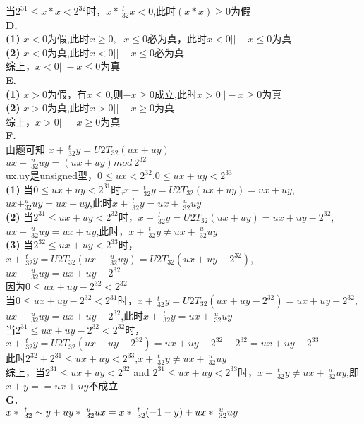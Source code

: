 \documentclass{article}
\begin{document}
\begin{CJK}{UTF8}{uyhei}
当$2^{ 31 }\le x*x<2^{ 32 }$时，$x*\ _{32}^tx<0$,此时$(x*x)\ge 0$为假	\\
\textbf{D.}	\\
\textbf{(1)} $x<0$为假,此时$x\ge 0$,$-x\le 0$必为真，此时$x<0 || -x\le 0$为真	\\
\textbf{(2)} $x<0$为真,此时$x<0 || -x\le 0$必为真	\\
综上，$x<0 || -x\le 0$为真	\\
\textbf{E.}	\\
\textbf{(1)} $x>0$为假，有$x\le 0$,则$-x\ge 0$成立,此时$x>0 ||-x\ge 0$为真	\\
\textbf{(2)} $x>0$为真,此时$x>0 ||-x\ge 0$为真	\\
综上，$x>0 ||-x\ge 0$为真	\\
\textbf{F.}	\\
由题可知
$x+\ _{32}^ty=U2T_{32}(ux+uy)$	\\
$ux+\ _{32}^uuy=( ux+uy ) mod\ 2^{32}$	\\
ux,uy是unsigned型，$0\le ux<2^{32}$,$0\le ux+uy<2^{33}$	\\
\textbf{(1)} 当$0\le ux+uy<2^{31}$时,$x+\ _{32}^ty=U2T_{32}(ux+uy)=ux+uy$,$ux+ _{32}^uuy=ux+uy$,此时$x+\ _{32}^ty=ux+\ _{32}^uuy$	\\
\textbf{(2)} 当$2^{31}\le ux+uy<2^{ 32 }$时，$x+\ _{32}^ty=U2T_{32}(ux+uy)=ux+uy-2^{32}$,$ux+\ _{32}^uuy=ux+uy$,此时，$x+\ _{32}^ty\ne ux+\ _{32}^uuy$	\\
\textbf{(3)} 当$2^{32}\le ux+uy<2^{33}$时，$x+\ _{32}^ty=U2T_{32}(ux+\ _{32}^uuy)=U2T_{32}(ux+uy-2^{32})$,$ux+\ _{32}^uuy=ux+uy-2^{32}$	\\
因为$0\le ux+uy-2^{32}<2^{32}$	\\
当$0\le ux+uy-2^{32}<2^{31}$时，$x+\ _{32}^ty=U2T_{32}(ux+uy-2^{32})=ux+uy-2^{32}$,$ux+\ _{32}^uuy=ux+uy-2^{32}$,此时$x+\ _{32}^ty=ux+\ _{32}^uuy$	\\
当$2^{31}\le ux+uy-2^{32}<2^{32}$时，$x+\ _{32}^ty=U2T_{32}(ux+uy-2^{32})=ux+uy-2^{32}-2^{32}=ux+uy-2^{33}$	\\
此时$2^{32}+2^{31}\le ux+uy<2^{33}$,$x+\ _{32}^ty\ne ux+\ _{32}^uuy$	\\
综上，当$2^{31}\le ux+uy<2^{32}$ and $2^{31}\le ux+uy<2^{33}$时，$x+\ _{32}^ty\ne ux+\ _{32}^uuy$,即$x+y == ux+uy$不成立	\\
\textbf{G.}	\\
\begin{math}
	x*\ _{32}^t\sim y+uy*\ _{32}^uux	\\
	=x*\ _{32}^t(-1-y)+ux*\ _{32}^uuy	\\

\end{math}
\end{CJK}
\end{document}
